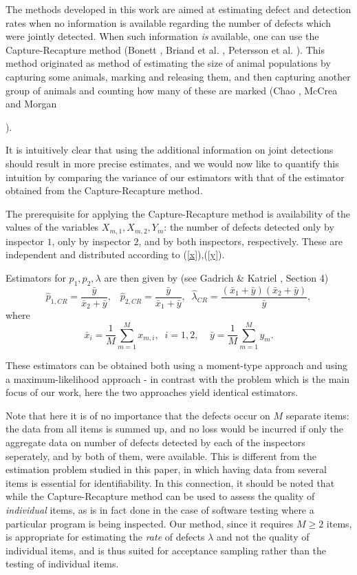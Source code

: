 \documentclass[a4paper,10pt,twoside]{article}
\begin{document}
The methods developed in this work are aimed at estimating defect and detection rates when 
no information is available regarding the number of defects which were jointly detected.
When such information {\it{is}} available, one can use the 
Capture-Recapture method (Bonett \cite{bonnet}, Briand et al. \cite{briand}, Petersson et al. \cite{petersson}). This method originated as method of estimating the size of animal populations
by capturing some animals, marking and releasing them, and then capturing another group of animals and counting 
how many of these are marked (Chao \cite{chao2}, McCrea and Morgan {\cite{mcrea}). 

It is intuitively clear that using the additional information on joint detections should result
in more precise estimates, and we would now like to quantify this intuition by comparing the variance 
of our estimators with that of the estimator obtained from the Capture-Recapture method.

The prerequisite for applying the Capture-Recapture method is availability of the values of the variables $X_{m,1},X_{m,2},Y_m$:
the number of defects detected only by inspector $1$, only by inspector $2$, and by both inspectors, respectively.
These are independent and distributed according to (\ref{x}),(\ref{y}).

Estimators for $p_1,p_2,\lambda$ are then given by (see Gadrich \& Katriel \cite{gadrich}, Section 4)
$$\hat{p}_{1,CR}=\frac{\bar{y}}{\bar{x}_2+\bar{y}},\;\;\;\hat{p}_{2,CR}=\frac{\bar{y}}{\bar{x}_1+\bar{y}},\;\;\hat{\lambda}_{CR}=\frac{(\bar{x}_1+\bar{y})(\bar{x}_2+\bar{y})}{\bar{y}},$$
where
$$\bar{x}_i=\frac{1}{M}\sum_{m=1}^M x_{m,i},\;\;i=1,2,\;\;\;\;\bar{y}=\frac{1}{M}\sum_{m=1}^M y_{m}.$$

These estimators can be obtained both using a moment-type approach and using a maximum-likelihood approach - 
in contrast with the problem which is the main focus of our work, here the two approaches yield identical estimators.

Note that here it is of no importance that the defects occur on $M$ separate items:  the data from
all items is summed up, and no loss would be incurred if only the aggregate data on number of defects detected by each of the
inspectors seperately, and by both of them, were available.
 This is different from the estimation problem studied in this paper, in which having data from several items is essential for identifiability. In this connection, it should be noted that while the Capture-Recapture method can be 
 used to assess the quality of {\it{individual}} items, as is in fact done in the case of software testing where a 
 particular program is being inspected. Our method, since it requires $M\geq 2$ items, is appropriate for estimating the
 {\it{rate}} of defects $\lambda$ and not the quality of individual items, and is thus suited for acceptance sampling rather
 than the testing of individual items.

}
\end{document}
